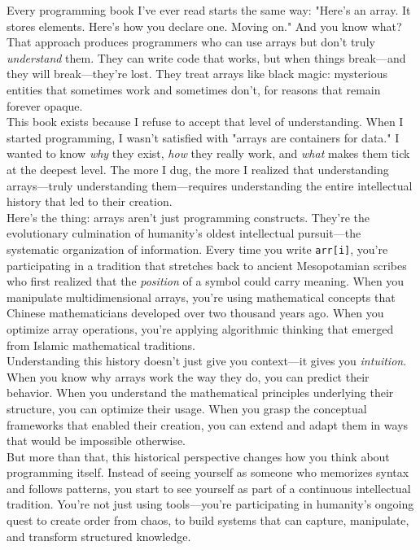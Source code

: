 Every programming book I've ever read starts the same way: "Here's an array. It stores elements. Here's how you declare one. Moving on." And you know what? That approach produces programmers who can use arrays but don't truly \emph{understand} them. They can write code that works, but when things break—and they will break—they're lost. They treat arrays like black magic: mysterious entities that sometimes work and sometimes don't, for reasons that remain forever opaque.\\
This book exists because I refuse to accept that level of understanding. When I started programming, I wasn't satisfied with "arrays are containers for data." I wanted to know \emph{why} they exist, \emph{how} they really work, and \emph{what} makes them tick at the deepest level. The more I dug, the more I realized that understanding arrays—truly understanding them—requires understanding the entire intellectual history that led to their creation.\\
Here's the thing: arrays aren't just programming constructs. They're the evolutionary culmination of humanity's oldest intellectual pursuit—the systematic organization of information. Every time you write \texttt{arr[i]}, you're participating in a tradition that stretches back to ancient Mesopotamian scribes who first realized that the \emph{position} of a symbol could carry meaning. When you manipulate multidimensional arrays, you're using mathematical concepts that Chinese mathematicians developed over two thousand years ago. When you optimize array operations, you're applying algorithmic thinking that emerged from Islamic mathematical traditions.\\
Understanding this history doesn't just give you context—it gives you \emph{intuition}. When you know why arrays work the way they do, you can predict their behavior. When you understand the mathematical principles underlying their structure, you can optimize their usage. When you grasp the conceptual frameworks that enabled their creation, you can extend and adapt them in ways that would be impossible otherwise.\\
But more than that, this historical perspective changes how you think about programming itself. Instead of seeing yourself as someone who memorizes syntax and follows patterns, you start to see yourself as part of a continuous intellectual tradition. You're not just using tools—you're participating in humanity's ongoing quest to create order from chaos, to build systems that can capture, manipulate, and transform structured knowledge.\newpage


